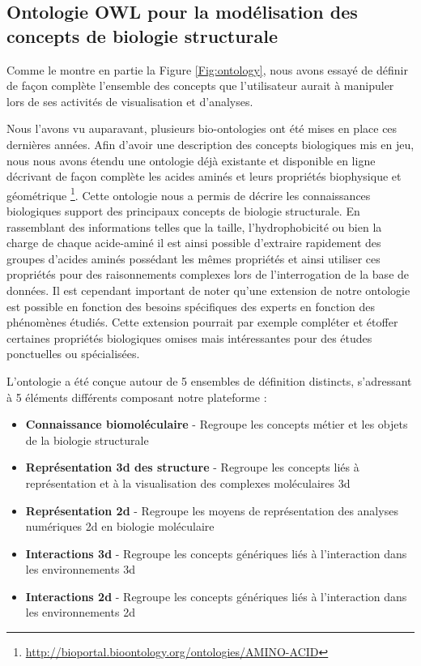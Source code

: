 
\subsection{Ontologie OWL pour la modélisation des concepts de biologie structurale} \label{owl_ontology}

Comme le montre en partie la Figure \ref{Fig:ontology}, nous avons essayé de définir de façon complète l'ensemble des concepts que l'utilisateur aurait à manipuler lors de ses activités de visualisation et d'analyses. 

Nous l'avons vu auparavant, plusieurs bio-ontologies ont été mises en place ces dernières années. Afin d'avoir une description des concepts biologiques mis en jeu, nous nous avons étendu une ontologie déjà existante et disponible en ligne décrivant de façon complète les acides aminés et leurs propriétés biophysique et géométrique  \footnote{\url{http://bioportal.bioontology.org/ontologies/AMINO-ACID}}. Cette ontologie nous a permis de décrire les connaissances biologiques support des principaux concepts de biologie structurale. En rassemblant des informations telles que la taille, l'hydrophobicité ou bien la charge de chaque acide-aminé il est ainsi possible d'extraire rapidement des groupes d'acides aminés possédant les mêmes propriétés et ainsi utiliser ces propriétés pour des raisonnements complexes lors de l'interrogation de la base de données. Il est cependant important de noter qu'une extension de notre ontologie est possible en fonction des besoins spécifiques des experts en fonction des phénomènes étudiés. Cette extension pourrait par exemple compléter et étoffer certaines propriétés biologiques omises mais intéressantes pour des études ponctuelles ou spécialisées.

L'ontologie a été conçue autour de 5 ensembles de définition distincts, s'adressant à 5 éléments différents composant notre plateforme : 

\begin{itemize}
  \item \textbf{Connaissance biomoléculaire} - Regroupe les concepts métier et les objets de la biologie structurale 
  \item \textbf{Représentation 3d des structure} - Regroupe les concepts liés à représentation et à la visualisation des complexes moléculaires 3d
  \item \textbf{Représentation 2d} - Regroupe les moyens de représentation des analyses numériques 2d en biologie moléculaire 
  \item \textbf{Interactions 3d} - Regroupe les concepts génériques liés à l'interaction dans les environnements 3d
  \item \textbf{Interactions 2d} - Regroupe les concepts génériques liés à l'interaction dans les environnements 2d
\end{itemize}

